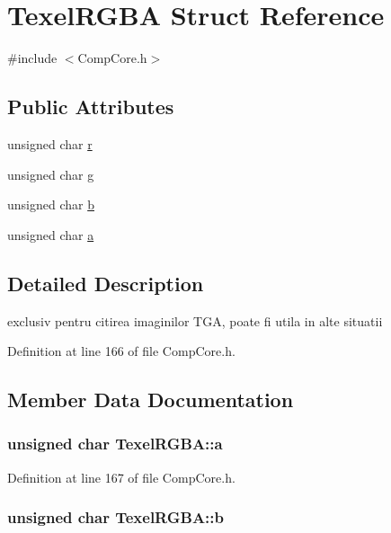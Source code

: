\hypertarget{struct_texel_r_g_b_a}{\section{Texel\-R\-G\-B\-A Struct Reference}
\label{struct_texel_r_g_b_a}
}


{\ttfamily \#include $<$Comp\-Core.\-h$>$}

\subsection*{Public Attributes}
\begin{DoxyCompactItemize}
\item 
unsigned char \hyperlink{struct_texel_r_g_b_a_a35804d005988bece75db0928273cd74d}{r}
\item 
unsigned char \hyperlink{struct_texel_r_g_b_a_a997ab15a88f5114bed505733605a3862}{g}
\item 
unsigned char \hyperlink{struct_texel_r_g_b_a_adac5a2af26ec9605db3f6fa59a1ca7d3}{b}
\item 
unsigned char \hyperlink{struct_texel_r_g_b_a_a3bffb7b8858479123e0c1e3abd53b541}{a}
\end{DoxyCompactItemize}


\subsection{Detailed Description}
exclusiv pentru citirea imaginilor T\-G\-A, poate fi utila in alte situatii 

Definition at line 166 of file Comp\-Core.\-h.



\subsection{Member Data Documentation}
\hypertarget{struct_texel_r_g_b_a_a3bffb7b8858479123e0c1e3abd53b541}{
\subsubsection[{a}]{\setlength{\rightskip}{0pt plus 5cm}unsigned char Texel\-R\-G\-B\-A\-::a}}\label{struct_texel_r_g_b_a_a3bffb7b8858479123e0c1e3abd53b541}


Definition at line 167 of file Comp\-Core.\-h.

\hypertarget{struct_texel_r_g_b_a_adac5a2af26ec9605db3f6fa59a1ca7d3}{
\subsubsection[{b}]{\setlength{\rightskip}{0pt plus 5cm}unsigned char Texel\-R\-G\-B\-A\-::b}}\label{struct_texel_r_g_b_a_adac5a2af26ec9605db3f6fa59a1ca7d3}



